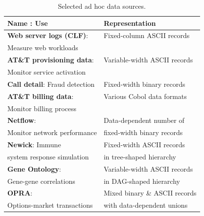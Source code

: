\begin{table}
\begin{center}
\begin{tabular}{l|l}
\hline
\textbf{Name} : Use   &  Representation               \\ \hline
\textbf{Web server logs (CLF)}:  &  Fixed-column ASCII records \\ 
Measure web workloads &                             \\ \hline
\textbf{AT\&T provisioning data}: & Variable-width ASCII records  \\ 
Monitor service activation &                              \\ \hline
\textbf{Call detail}: Fraud detection  &  Fixed-width binary records \\  \hline 
\textbf{AT\&T billing data}: & Various Cobol data formats  \\ 
Monitor billing process   &                             \\ \hline
\textbf{Netflow}:            & Data-dependent number of     \\ 
Monitor network performance  & fixed-width binary records  \\ \hline
\textbf{Newick}:   Immune  & Fixed-width ASCII records \\ 
system response simulation & in tree-shaped hierarchy\\ \hline                                
\textbf{Gene Ontology}:    & Variable-width ASCII records \\
Gene-gene correlations     & in DAG-shaped hierarchy \\ \hline
\textbf{OPRA}:              & Mixed binary \& ASCII records \\
Options-market transactions & with data-dependent unions \\ \hline
\end{tabular}
\caption{Selected ad hoc data sources.}
\label{figure:data-sources}
\end{center}
\end{table}

